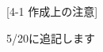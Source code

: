 \newpage
\pagestyle{leaflet}
[4-1 作成上の注意]
\begin{multicols*}{2}
\begin{center}
    {\selectsize{13pt}{13pt}5/20に追記します}
\end{center}
\end{multicols*}